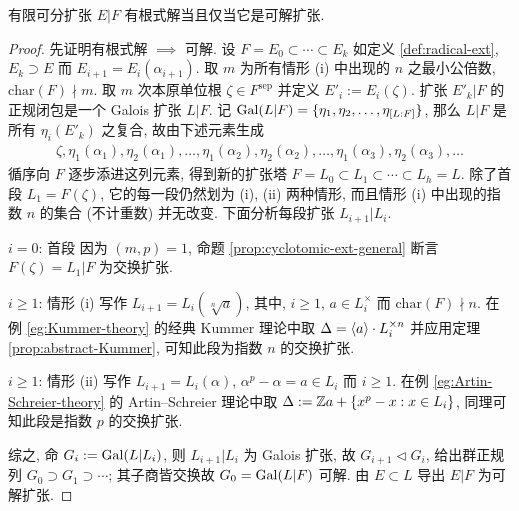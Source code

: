 \begin{theorem}[É.\ Galois]\label{prop:characterization-solvable-radicals}
	有限可分扩张 $E|F$ 有根式解当且仅当它是可解扩张.
\end{theorem}
\begin{proof}
	先证明有根式解 $\implies$ 可解. 设 $F = E_0 \subset \cdots \subset E_k$ 如定义 \ref{def:radical-ext}, $E_k \supset  E$ 而 $E_{i+1} = E_i(\alpha_{i+1})$. 取 $m$ 为所有情形 (i) 中出现的 $n$ 之最小公倍数, $\text{char}(F) \nmid m$. 取 $m$ 次本原单位根 $\zeta \in F^\text{sep}$ 并定义 $E'_i := E_i(\zeta)$. 扩张 $E'_k|F$ 的正规闭包是一个 Galois 扩张 $L|F$. 记 $\operatorname{Gal}(L|F) = \{ \eta_1, \eta_2, \ldots, \eta_{[L:F]} \}$, 那么 $L|F$ 是所有 $\eta_i(E'_k)$ 之复合, 故由下述元素生成
	\begin{gather*}
		\zeta, \eta_1(\alpha_1), \eta_2(\alpha_1), \ldots, \eta_1(\alpha_2), \eta_2(\alpha_2), \ldots, \eta_1(\alpha_3), \eta_2(\alpha_3), \ldots
	\end{gather*}
	循序向 $F$ 逐步添进这列元素, 得到新的扩张塔 $F = L_0 \subset L_1 \subset \cdots \subset L_h = L$. 除了首段 $L_1 = F(\zeta)$, 它的每一段仍然划为 (i), (ii) 两种情形, 而且情形 (i) 中出现的指数 $n$ 的集合 (不计重数) 并无改变. 下面分析每段扩张 $L_{i+1}|L_i$.
	\begin{compactdesc}
		\item[$i=0$: 首段] 因为 $(m,p)=1$, 命题 \ref{prop:cyclotomic-ext-general} 断言 $F(\zeta)=L_1|F$ 为交换扩张.
		\item[$i \geq 1$: 情形 (i)] 写作 $L_{i+1} = L_i(\sqrt[n]{a})$, 其中, $i \geq 1$, $a \in L_i^\times$ 而 $\text{char}(F) \nmid n$. 在例 \ref{eg:Kummer-theory} 的经典 Kummer 理论中取 $\Delta = \left\langle a \right\rangle \cdot L_i^{\times n}$ 并应用定理 \ref{prop:abstract-Kummer}, 可知此段为指数 $n$ 的交换扩张.
		\item[$i \geq 1$: 情形 (ii)] 写作 $L_{i+1} = L_i(\alpha)$, $\alpha^p - \alpha = a \in L_i$ 而 $i \geq 1$. 在例 \ref{eg:Artin-Schreier-theory} 的 Artin--Schreier 理论中取 $\Delta := \mathbb{Z} a + \{x^p-x : x \in L_i\}$, 同理可知此段是指数 $p$ 的交换扩张.
	\end{compactdesc}
	综之, 命 $G_i := \operatorname{Gal}(L|L_i)$, 则 $L_{i+1}|L_i$ 为 Galois 扩张, 故 $G_{i+1} \lhd G_i$, 给出群正规列 $G_0 \supset G_1 \supset \cdots$; 其子商皆交换故 $G_0 = \operatorname{Gal}(L|F)$ 可解. 由 $E \subset L$ 导出 $E|F$ 为可解扩张.

\end{proof}
